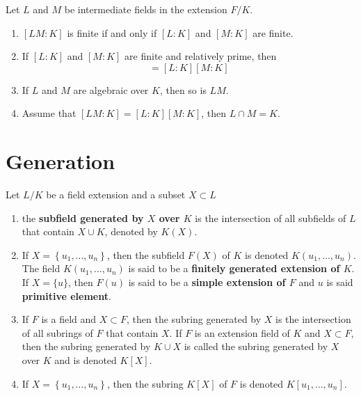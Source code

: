 \begin{corollary}
    Let $L$ and $M$ be intermediate fields in the extension $F/K$.
    \begin{enumerate}
        \item
              $[L M: K]$ is finite if and only if $[L: K]$ and $[M: K]$ are finite.

        \item
              If $[L: K]$ and $[M: K]$ are finite and relatively prime, then
              \begin{equation*}
                  [L M: K]=[L: K][M: K]
              \end{equation*}

        \item
              If $L$ and $M$ are algebraic over $K$, then so is $L M$.

        \item
              Assume that $[L M: K]=[L: K][M: K]$, then $L \cap M=K$.
    \end{enumerate}
\end{corollary}





\section{Generation} %
\begin{definition}
    Let $L/K$ be a field extension and a subset $X \subset L$
    \begin{enumerate}
        \item
              the \textbf{subfield  generated by ${X}$ over $K$} is the intersection of all subfields of $L$ that contain $X\cup K$, denoted by $K(X)$.
        \item
              If $X=\left\{u_1, \ldots, u_n\right\}$, then the subfield $F(X)$ of $K$ is denoted $K\left(u_1, \ldots, u_n\right)$.
              The field $K\left(u_1, \ldots, u_n\right)$ is said to be a \textbf{finitely generated extension of $K$}.
              If $X=\{u\}$, then $F(u)$ is said to be a \textbf{simple extension of $F$} and $u$ is said \textbf{primitive element}.
        \item
              If $F$ is a field and $X \subset F$, then the  subring generated by $X$ is the intersection of all subrings of $F$ that contain $X$.
              If $F$ is an extension field of $K$ and $X \subset F$, then the subring generated by $K \cup X$ is called the subring generated by $ X$ over $ K$ and is denoted $K[X]$.
        \item
              If $X=\left\{u_1, \ldots, u_n\right\}$, then the subring $K[X]$ of $F$ is denoted $K\left[u_1, \ldots, u_n\right]$.
    \end{enumerate}
\end{definition}




